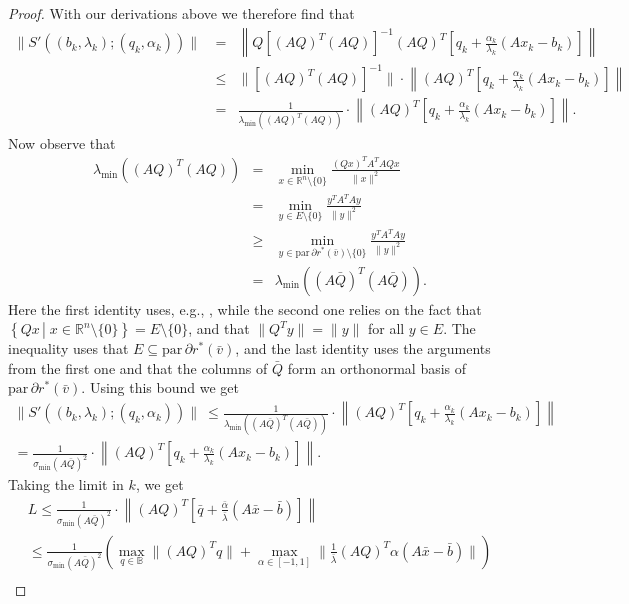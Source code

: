 \documentclass[reqno]{amsart}
\numberwithin{equation}{section}
\newcommand{\B}{\mathbb{B}}
\newcommand{\R}{\mathbb{R}}
\newcommand{\x}{\bar{x}}
\newcommand{\set}[2]{\left\{#1\,\left\vert\; #2\right.\right\}}
\newcommand{\para}{\mathrm{par}\,}
\begin{document}
\begin{proof}
With our derivations above we therefore find that
 \begin{eqnarray*}
 \|S'((b_k,\lambda_k);(q_k,\alpha_k))\|\ & = & \left\|Q[(AQ)^T(AQ)]^{-1}(AQ)^T\left[q_k+\frac{\alpha_k}{\lambda_k}(Ax_k-b_k)\right]\right\|\\
 & \leq & \|[(AQ)^T(AQ)]^{-1}\|\cdot \left\|(AQ)^T\left[q_k+\frac{\alpha_k}{\lambda_k}(Ax_k-b_k)\right]\right\|\\
 & = & \frac{1}{\lambda_{\min}((AQ)^T(AQ))}\cdot \left\|(AQ)^T\left[q_k+\frac{\alpha_k}{\lambda_k}(Ax_k-b_k)\right]\right\|.
 \end{eqnarray*}
Now observe that 
\begin{eqnarray*}
    \lambda_{\min}((AQ)^T(AQ))& = & \min_{x\in \R^n\setminus\{0\}}\frac{(Qx)^TA^TAQx}{\|x\|^2}\\
    &=& \min_{y\in E\setminus\{0\}}\frac{y^TA^TAy}{\|y\|^2}\\
    & \geq  & \min_{y\in \para \partial r^*(\bar v)\setminus\{0\}}\frac{y^TA^TAy}{\|y\|^2}\\
    & = & \lambda_{\min}((A\bar Q)^T(A\bar Q)).
\end{eqnarray*}
Here the first identity uses, e.g., \cite[Theorem 4.2.6]{HoJ 13}, while the second one relies on the fact that $\set{Qx}{x\in \R^n\setminus\{0\}}=E\setminus\{0\}$, and that $\|Q^Ty\|=\|y\|$ for all $y\in E$. The inequality  uses that $E\subseteq\para \partial r^*(\bar v)$, and the last identity uses the arguments from the first one and that the columns of $\bar Q$ form an orthonormal basis of $ \para \partial r^*(\bar v)$. 
Using this bound we get 
\begin{align*}
        \|S'((b_k,\lambda_k);(q_k,\alpha_k))\|\ \le 
        \frac{1}{\lambda_{\min}((A \bar Q)^T(A \bar Q))}\cdot \left\|(AQ)^T\left[q_k+\frac{\alpha_k}{\lambda_k}(Ax_k-b_k)\right]\right\|
        \\ = \frac{1}{\sigma_{\min}(A \bar Q)^2} \cdot \left\|(AQ)^T\left[q_k+\frac{\alpha_k}{\lambda_k}(Ax_k-b_k)\right]\right\|.
\end{align*} Taking the limit in $k$, we get \begin{align*}
    L \le \frac{1}{\sigma_{\min}(A \bar Q)^2} \cdot \left\|(AQ)^T\left[\bar q+\frac{\bar \alpha}{\bar \lambda}(A \x- \bar b)\right]\right\| \\
    \le \frac{1}{\sigma_{\min}(A \bar Q)^2} \left( \max_{q \in \B} \lVert (AQ)^T q \rVert + \max_{\alpha \in [-1, 1]} \lVert \frac{1}{\bar \lambda} (AQ)^T \alpha (A \x - \bar{b}) \rVert \right) \\

\end{align*}
\end{proof}
\end{document}
